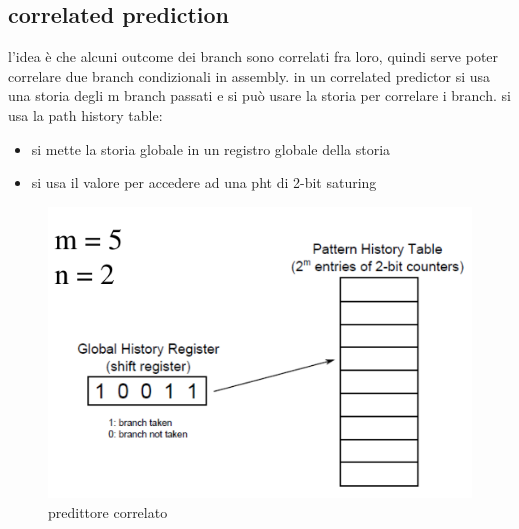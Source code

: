 \documentclass[12pt, oneside]{extbook} %
\begin{document}
\subsection{correlated prediction}
l'idea è che alcuni outcome dei branch sono correlati fra loro, quindi serve poter correlare due branch condizionali in assembly. in un correlated predictor si usa una storia degli m branch passati e si può usare la storia per correlare i branch. si usa la path history table:
\begin{itemize}
\item si mette la storia globale in un registro globale della storia
\item si usa il valore per accedere ad una pht di 2-bit saturing 
\end{itemize}
\begin{figure}[!h]
	\includegraphics[scale=0.5]{immagini/corr_pred}
	\caption{predittore correlato}
\end{figure}
\end{document}
